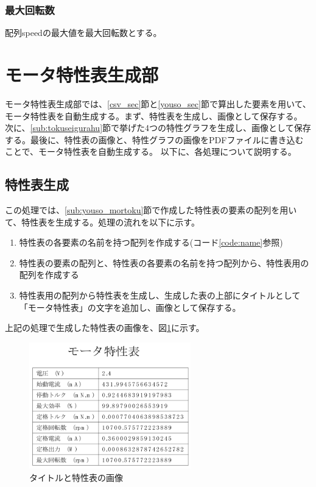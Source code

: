 \subsubsection{最大回転数}\label{sub:sub:saidaikai}
配列speedの最大値を最大回転数とする。

\section{モータ特性表生成部}\label{mortoku_sec}
モータ特性表生成部では、\ref{csv_sec}節と\ref{youso_sec}節で算出した要素を用いて、モータ特性表を自動生成する。まず、特性表を生成し、画像として保存する。
次に、\ref{sub:tokuseigurahu}節で挙げた4つの特性グラフを生成し、画像として保存する。最後に、特性表の画像と、特性グラフの画像をPDFファイルに書き込むことで、モータ特性表を自動生成する。
以下に、各処理について説明する。

\subsection{特性表生成}\label{sub:mortortoku}
この処理では、\ref{sub:youso_mortoku}節で作成した特性表の要素の配列を用いて、特性表を生成する。処理の流れを以下に示す。
\begin{enumerate}
    \item 特性表の各要素の名前を持つ配列を作成する(コード\ref{code:name}参照)
    \item 特性表の要素の配列と、特性表の各要素の名前を持つ配列から、特性表用の配列を作成する
    \item 特性表用の配列から特性表を生成し、生成した表の上部にタイトルとして「モータ特性表」の文字を追加し、画像として保存する。
\end{enumerate}
上記の処理で生成した特性表の画像を、図\ref{fig:toku_gazou}に示す。
\begin{figure}[t]
	
\end{figure}
\begin{figure}[t]
	\centering
	\includegraphics[width=7cm]{./Image/characteristicTable.png}
	\caption{タイトルと特性表の画像}
	\label{fig:toku_gazou}
\end{figure}
